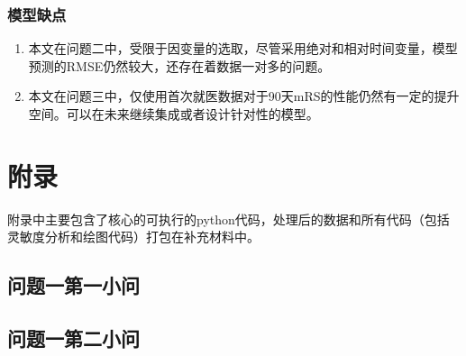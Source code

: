 \documentclass[bwprint]{gmcmthesis}
\begin{document}
\subsubsection{模型缺点}
\begin{enumerate}
\item 本文在问题二中，受限于因变量的选取，尽管采用绝对和相对时间变量，模型预测的RMSE仍然较大，还存在着数据一对多的问题。
    \item 本文在问题三中，仅使用首次就医数据对于90天mRS的性能仍然有一定的提升空间。可以在未来继续集成或者设计针对性的模型。
\end{enumerate}
    
    






\clearpage




\clearpage
\appendix

\section{附录}
附录中主要包含了核心的可执行的python代码，处理后的数据和所有代码（包括灵敏度分析和绘图代码）打包在补充材料中。
\subsection{问题一第一小问}

\subsection{问题一第二小问}


% 
\end{document}
